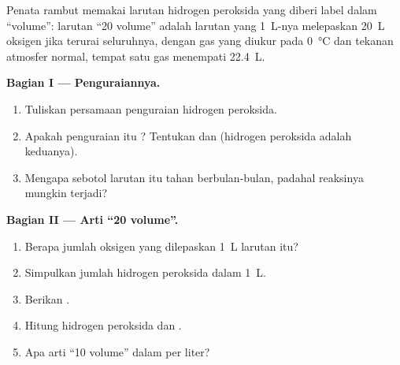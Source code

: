 \begin{problem}
\label{pb:g12:catalysis:1}
Penata rambut memakai larutan hidrogen peroksida yang diberi label
dalam ``volume'': larutan ``20 volume'' adalah larutan yang
\qty{1}{L}-nya melepaskan \qty{20}{L} oksigen jika terurai seluruhnya,
dengan gas yang diukur pada \qty{0}{\celsius} dan tekanan atmosfer
normal, tempat satu  gas menempati \qty{22.4}{L}.

\medskip
\noindent\textbf{Bagian I --- Penguraiannya.}
\begin{enumerate}
  \item Tuliskan persamaan penguraian hidrogen peroksida.
  \item Apakah penguraian itu ? Tentukan  dan
         (hidrogen peroksida adalah keduanya).
  \item Mengapa sebotol larutan itu tahan berbulan-bulan, padahal
        reaksinya mungkin terjadi?
\end{enumerate}

\medskip
\noindent\textbf{Bagian II --- Arti ``20 volume''.}
\begin{enumerate}[resume]
  \item Berapa jumlah oksigen yang dilepaskan \qty{1}{L} larutan itu?
  \item Simpulkan jumlah hidrogen peroksida dalam \qty{1}{L}.
  \item Berikan .
  \item Hitung  hidrogen peroksida dan .
  \item Apa arti ``10 volume'' dalam  per liter?
\end{enumerate}


\end{problem}
